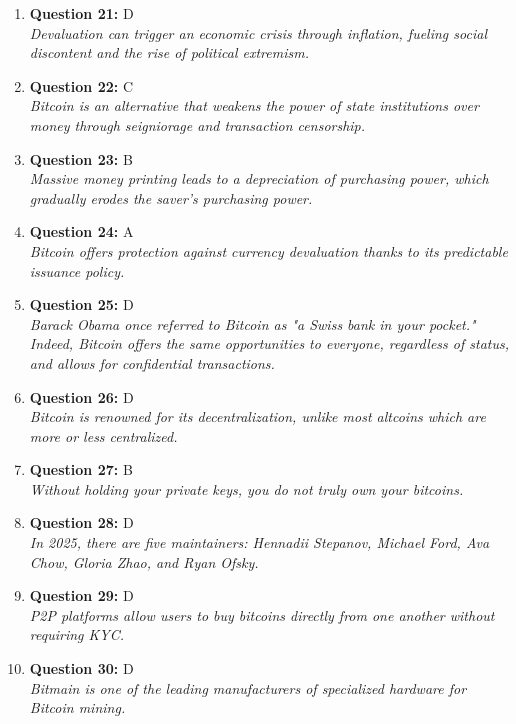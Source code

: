 \documentclass[12pt,a4paper]{article}
\begin{document}
\begin{enumerate}
\item \textbf{Question 21:} D
\\ \textit{Devaluation can trigger an economic crisis through inflation, fueling social discontent and the rise of political extremism.}

\item \textbf{Question 22:} C
\\ \textit{Bitcoin is an alternative that weakens the power of state institutions over money through seigniorage and transaction censorship.}

\item \textbf{Question 23:} B
\\ \textit{Massive money printing leads to a depreciation of purchasing power, which gradually erodes the saver’s purchasing power.}

\item \textbf{Question 24:} A
\\ \textit{Bitcoin offers protection against currency devaluation thanks to its predictable issuance policy.}

\item \textbf{Question 25:} D
\\ \textit{Barack Obama once referred to Bitcoin as "a Swiss bank in your pocket." Indeed, Bitcoin offers the same opportunities to everyone, regardless of status, and allows for confidential transactions.}

\item \textbf{Question 26:} D
\\ \textit{Bitcoin is renowned for its decentralization, unlike most altcoins which are more or less centralized.}

\item \textbf{Question 27:} B
\\ \textit{Without holding your private keys, you do not truly own your bitcoins.}

\item \textbf{Question 28:} D
\\ \textit{In 2025, there are five maintainers: Hennadii Stepanov, Michael Ford, Ava Chow, Gloria Zhao, and Ryan Ofsky.}

\item \textbf{Question 29:} D
\\ \textit{P2P platforms allow users to buy bitcoins directly from one another without requiring KYC.}

\item \textbf{Question 30:} D
\\ \textit{Bitmain is one of the leading manufacturers of specialized hardware for Bitcoin mining.}


\end{enumerate}
\end{document}
